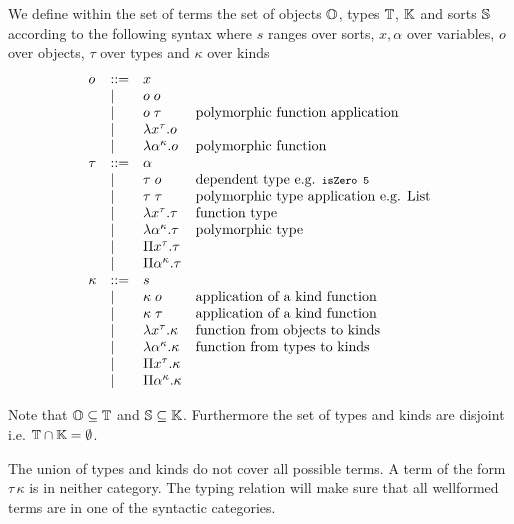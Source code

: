 \begin{definition}
  We define within the set of terms the set of objects $\Objects$, types
  $\Types$, $\Kinds$ and sorts $\Sorts$ according to the following syntax
  where $s$ ranges over sorts, $x,\alpha$ over variables, $o$ over objects,
  $\tau$ over types and $\kappa$ over kinds
  $$
  \begin{array}{llll}
    o &::= & x
    \\
      & | & o \; o
    \\
      & | & o \; \tau & \text{polymorphic function application}
    \\
      & | & \lambda x^\tau. o
    \\
      & | & \lambda \alpha^\kappa. o
      & \text{polymorphic function}
    \\
    
    \tau & ::= & \alpha
    \\
      & | & \tau \; o & \text{dependent type e.g. \code{isZero 5}}
    \\
      & | & \tau \; \tau & \text{polymorphic type application e.g. List}
    \\
      & | & \lambda x^\tau. \tau        & \text{function type}
    \\
      & | & \lambda \alpha^\kappa. \tau &\text{polymorphic type}
    \\
      & | & \Pi x^\tau. \tau
    \\
      & | & \Pi \alpha^\kappa. \tau
    \\
    
    \kappa & ::= & s
    \\
      & | & \kappa \; o                     &\text{application of a kind function}
    \\
      & | & \kappa \; \tau                  &\text{application of a kind function}
    \\
      & | & \lambda x^\tau. \kappa          &\text{function from objects to kinds}
    \\
      & | & \lambda \alpha^\kappa. \kappa   &\text{function from types to kinds}
    \\
      & | & \Pi x^\tau . \kappa
    \\
      & | & \Pi \alpha^\kappa . \kappa
  \end{array}
  $$
\end{definition}
%
Note that $\Objects \subseteq \Types$ and $\Sorts \subseteq
\Kinds$. Furthermore the set of types and kinds are disjoint i.e. $\Types \cap
\Kinds = \emptyset$.

The union of types and kinds do not cover all possible terms. A term of the
form $\tau \, \kappa$ is in neither category. The typing relation will make
sure that all wellformed terms are in one of the syntactic categories.


